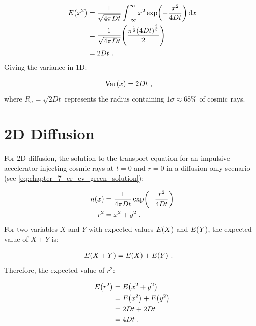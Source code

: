 \begin{equation}
    \begin{aligned}
        E\qty(x^2)&=\frac{1}{\sqrt{4\pi Dt}}\int_{-\infty}^\infty x^2\exp(-\frac{x^2}{4Dt})\dd{x} \\
        &=\frac{1}{\sqrt{4\pi Dt}} \qty(\frac{\pi^\frac{1}{2} \qty(4Dt)^\frac{3}{2}}{2}) \\
        &=2Dt\text{ .} 
    \end{aligned}
\end{equation}
\noindent Giving the variance in 1D:

\begin{equation}
    \begin{aligned}
        \mathrm{Var}\qty(x)&=2Dt\text{ ,} 
    \end{aligned}
\end{equation}
\noindent where $R_\sigma=\sqrt{2Dt}$ represents the radius containing $1\sigma\approx 68\%$ of cosmic rays.

\section{2D Diffusion}

For 2D diffusion, the solution to the transport equation for an impulsive accelerator injecting cosmic rays at $t=0$ and $r=0$ in a diffusion-only scenario (see \autoref{eq:chapter_7_cr_ev_green_solution}):

\begin{equation}
    \begin{aligned}
        n\qty(x)&=\frac{1}{4\pi Dt}\exp(-\frac{r^2}{4Dt}) \\
        r^2&=x^2+y^2\text{ .} 
    \end{aligned}
\end{equation}
For two variables $X$ and $Y$ with expected values $E\qty(X)$ and $E\qty(Y)$, the expected value of $X+Y$ is:

\begin{equation}
    \begin{aligned}
        E\qty(X+Y)&=E\qty(X)+E\qty(Y)\text{ .} 
    \end{aligned}
\end{equation}
\noindent Therefore, the expected value of $r^2$:

\begin{equation}
    \begin{aligned}
        E\qty(r^2)&=E\qty(x^2+y^2) \\
        &=E\qty(x^2)+E\qty(y^2) \\
        &= 2Dt + 2Dt \\
        &=4Dt\text{ .} 
    \end{aligned}
\end{equation}

